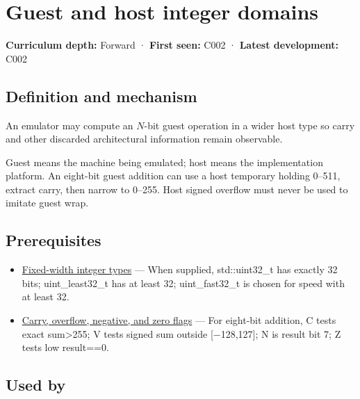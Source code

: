 \hypertarget{appendix-33e7a011b684}{}\label{referencestart:appendix-33e7a011b684}
\section{Guest and host integer domains}\label{appendix-33e7a011b684-guest-and-host-integer-domains}

\textbf{Curriculum depth:} Forward · \textbf{First seen:} C002 · \textbf{Latest development:} C002

\begin{allmightroledefinition}

\subsection{Definition and mechanism}\label{appendix-33e7a011b684-definition-and-mechanism}

An emulator may compute an \(N\)-bit guest operation in a wider host type so carry and other discarded architectural information remain observable.

\end{allmightroledefinition}

Guest means the machine being emulated; host means the implementation platform. An eight-bit guest addition can use a host temporary holding 0--511, extract carry, then narrow to 0--255. Host signed overflow must never be used to imitate guest wrap.

\subsection{Prerequisites}\label{appendix-33e7a011b684-prerequisites}

\begin{itemize}
\tightlist
\item
  \hyperref[appendix-cc04044b5782]{Fixed-width integer types} --- When supplied, std::uint32\_t has exactly 32 bits; uint\_least32\_t has at least 32; uint\_fast32\_t is chosen for speed with at least 32.
\item
  \hyperref[appendix-8d687c9c08ab]{Carry, overflow, negative, and zero flags} --- For eight-bit addition, C tests exact sum\textgreater255; V tests signed sum outside {[}−128,127{]}; N is result bit 7; Z tests low result==0.
\end{itemize}

\subsection{Used by}\label{appendix-33e7a011b684-used-by}

